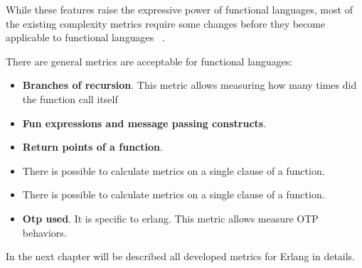 While these features raise the expressive power of functional languages,
most of the existing complexity metrics require some changes before they become applicable to functional languages ~\cite{metrics3}.

There are general metrics are acceptable for functional languages:
\begin{itemize}
	\item \textbf{Branches of recursion}. This metric allows measuring how many times did the function call itself
	\item \textbf{Fun expressions and message passing constructs}.
	\item \textbf{Return points of a function}.
	\item There is possible to calculate metrics on a single clause of a function.
	\item There is possible to calculate metrics on a single clause of a function.
	\item \textbf{Otp used}. It is specific to erlang. This metric allows measure OTP behaviors.
\end{itemize}

In the next chapter will be described all developed metrics for Erlang in details.